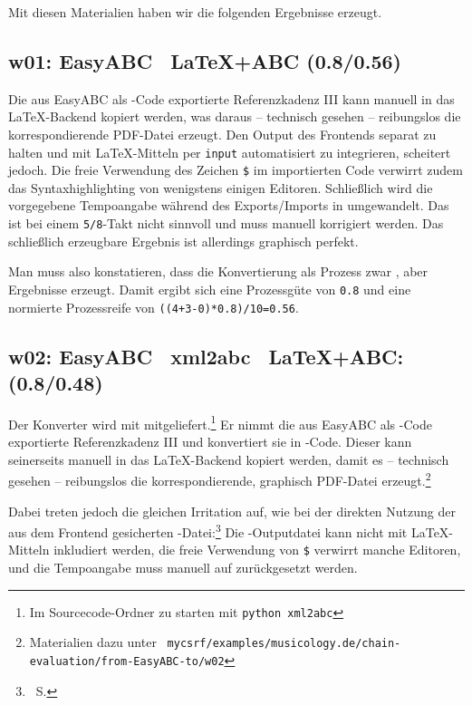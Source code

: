 Mit diesen Materialien haben wir die folgenden Ergebnisse erzeugt.

\subsection{w01: Easy\-ABC \ra\ \LaTeX+ABC (0.8/0.56)}\label{w01}

Die aus Easy\-ABC als -Code exportierte Referenzkadenz III kann manuell
in das \LaTeX-Backend kopiert werden, was daraus -- technisch gesehen --
reibungslos die korrespondierende PDF-Datei erzeugt. Den Output des Frontends
separat zu halten und mit \LaTeX-Mitteln per \texttt{input} automatisiert zu
integrieren, scheitert jedoch. Die freie Verwendung des Zeichen \texttt{\$} im
importierten Code verwirrt zudem das Syntaxhighlighting von wenigstens einigen
Editoren. Schließlich wird die vorgegebene Tempoangabe \texttt{} während
des Exports/Imports in \texttt{} umgewandelt. Das ist bei einem
\texttt{5/8}-Takt nicht sinnvoll und muss manuell korrigiert werden. Das
schließlich erzeugbare Ergebnis ist allerdings graphisch perfekt.

Man muss also konstatieren, dass die Konvertierung als Prozess zwar
, aber  Ergebnisse erzeugt. Damit ergibt sich
eine Prozessgüte von \texttt{0.8} und eine normierte Prozessreife von
\texttt{((4+3-0)*0.8)/10=0.56}.

\subsection{w02: Easy\-ABC \ra\ xml2abc \ra\ \LaTeX+ABC: (0.8/0.48)}\label{w02}

Der Konverter  wird mit  mitgeliefert.\footnote{Im
Sourcecode-Ordner zu starten mit \texttt{python xml2abc}} Er nimmt die aus
Easy\-ABC als -Code exportierte Referenzkadenz III und konvertiert sie
in -Code. Dieser kann seinerseits manuell in das \LaTeX-Backend kopiert
werden, damit es -- technisch gesehen -- reibungslos die korrespondierende,
graphisch  PDF-Datei erzeugt.\footnote{Materialien dazu unter
\ra\
\texttt{mycsrf/examples/musicology.de/chain-evaluation/from-EasyABC-to/w02}}

Dabei treten jedoch die gleichen Irritation auf, wie bei der direkten Nutzung
der aus dem Frontend gesicherten \acc{abc}-Datei:\footnote{\ra\ S.\pageref{w01}}
Die \acc{ABC}-Outputdatei kann nicht mit \LaTeX-Mitteln inkludiert werden, die
freie Verwendung von \texttt{\$} verwirrt manche Editoren, und die Tempoangabe
muss manuell auf \texttt{\Acht=90} zurückgesetzt werden.

